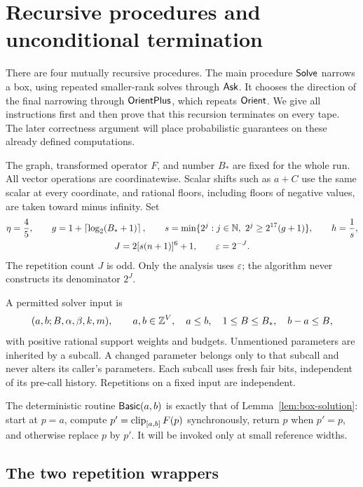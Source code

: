 \section{Recursive procedures and unconditional termination}
\label{sec:algorithm}

There are four mutually recursive procedures. The main procedure
$\mathsf{Solve}$ narrows a box, using repeated smaller-rank solves through
$\mathsf{Ask}$. It chooses the direction of the final narrowing through
$\mathsf{OrientPlus}$, which repeats $\mathsf{Orient}$. We give all instructions
first and then prove that this recursion terminates on every tape.
The later correctness argument will place probabilistic guarantees on
these already defined computations.

The graph, transformed operator $F$, and number $B_*$ are fixed for the
whole run. All vector operations are coordinatewise. Scalar shifts such
as $a+C$ use the same scalar at every coordinate, and rational floors,
including floors of negative values, are taken toward minus infinity.
Set
\begin{equation}\label{eq:global-parameters}
\begin{gathered}
 \eta=\frac45,\qquad
 g=1+\left\lceil\log_2(B_*+1)\right\rceil,\qquad
 s=\min\{2^j:j\in\mathbb N,\ 2^j\ge2^{17}(g+1)\},\qquad h=\frac1s,\\
 J=2[s(n+1)]^6+1,\qquad \varepsilon=2^{-J}.
\end{gathered}
\end{equation}
The repetition count $J$ is odd. Only the analysis uses $\varepsilon$;
the algorithm never constructs its denominator $2^J$.

A permitted solver input is
\[
 (a,b;B,\alpha,\beta,k,m),\qquad
 a,b\in\mathbb Z^V,\quad a\le b,\quad1\le B\le B_*,\quad b-a\le B,
\]
with positive rational support weights and budgets. Unmentioned
parameters are inherited by a subcall. A changed parameter belongs
only to that subcall and never alters its caller's parameters.
Each subcall uses fresh fair bits, independent of its pre-call history.
Repetitions on a fixed input are independent.

The deterministic routine $\mathsf{Basic}(a,b)$ is exactly that of
Lemma~\ref{lem:box-solution}: start at $p=a$, compute
$p'=\operatorname{clip}_{[a,b]}F(p)$ synchronously, return $p$ when $p'=p$, and
otherwise replace $p$ by $p'$. It will be invoked only at small
reference widths.

\subsection{The two repetition wrappers}

